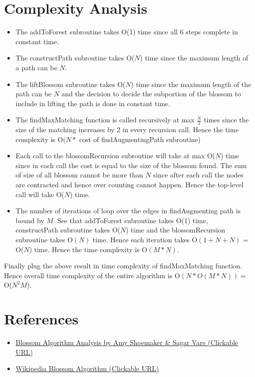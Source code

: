 \documentclass{article}
\begin{document}
\section{Complexity Analysis}
\begin{itemize}
    \item The addToForest subroutine takes O(1) time since all 6 steps complete in constant time.
    \item The constructPath subroutine takes O($N$) time since the maximum length of a path can be $N$.
    \item The liftBlossom subroutine takes O($N$) time since the maximum length of the path can be $N$ and the decision to decide the subportion of the blossom to include in lifting the path is done in constant time.
    \item The findMaxMatching function is called recursively at max $\frac{N}{2}$ times since the size of the matching increases by 2 in every recursion call. Hence the time complexity is O$(N*$ cost of findAugmentingPath subroutine)
    \item Each call to the blossomRecursion subroutine will take at max O($N$) time since in each call the cost is equal to the size of the blossom found. The sum of size of all blossom cannot be more than $N$ since after each call the nodes are contracted and hence over counting cannot happen. Hence the top-level call will take O($N$) time.
    \item The number of iterations of loop over the edges in findAugmenting path is bound by $M$. See that addToForest subroutine takes O(1) time, constructPath subroutine takes O($N$) time and the blossomRecursion subroutine takes O$(N)$ time. Hence each iteration takes O$(1+N+N)$ = O($N$) time. Hence the time complexity is O$(M*N)$.
\end{itemize}

Finally plug the above result in time complexity of findMaxMatching function. Hence overall time complexity of the entire algorithm is O$(N * O(M*N)) = $ O($N^2M$).

\section{References}
\begin{itemize}
    \item \href{https://stanford.edu/~rezab/classes/cme323/S16/projects_reports/shoemaker_vare.pdf}{\color{blue} Blossom Algorithm Analysis by Amy Shoemaker \& Sagar Vare (Clickable URL)}
    \item \href{https://en.wikipedia.org/wiki/Blossom_algorithm}{\color{blue} Wikipedia Blossom Algorithm (Clickable URL)}
\end{itemize}
\end{document}
